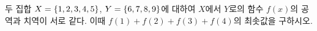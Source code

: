 두 집합 $X=\{1{,}\mkern3mu\mathopen{}2{,}\mkern3mu\mathopen{}3{,}\mkern3mu\mathopen{}4{,}\mkern3mu\mathopen{}5\}$, $Y=\{6{,}\mkern3mu\mathopen{}7{,}\mkern3mu\mathopen{}8{,}\mkern3mu\mathopen{}9\}$에 대하여 $X$에서 $Y$로의 함수 $f(x)$의 공역과 치역이 서로 같다. 이때 $f(1)+f(2)+f(3)+f(4)$의 최솟값을 구하시오.
